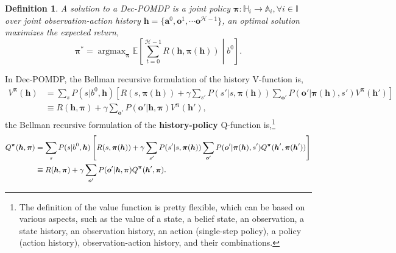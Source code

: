 \documentclass{article} %
\DeclareMathOperator*{\argmax}{argmax}
\newtheorem{definition}{Definition}
\begin{document}
\begin{definition}
A solution to a Dec-POMDP is a joint policy $\boldsymbol{\pi}:\mathbb{H}_i\to\mathbb{A}_i, \forall i \in \mathbb{I}$ over joint observation-action history $\boldsymbol{h}=\{\boldsymbol{a}^{0}, \boldsymbol{o}^{1}, \cdots \boldsymbol{o}^{\mathcal{H}-1}\}$, an optimal solution maximizes the expected return,
\[
\boldsymbol{\pi}^*=\argmax_{\boldsymbol{\pi}}\mathbb{E}\left[\textstyle\sum_{t=0}^{\mathcal{H}-1}R(\boldsymbol{h}, \boldsymbol{\pi}(\boldsymbol{h}))\middle|b^0\right].
\]
\end{definition}

In Dec-POMDP, the Bellman recursive formulation of the history V-function is,
\begin{equation}\label{eq:decpomdp-V}
\begin{aligned}
    V^{\boldsymbol{\pi}}(\boldsymbol{h}) &= \sum_{s} P(s|b^0, \boldsymbol{h})\left[R(s, \boldsymbol{\pi}(\boldsymbol{h}))+\gamma \sum_{s'}P(s'|s, \boldsymbol{\pi}(\boldsymbol{h})) \sum_{\boldsymbol{o}'}P(\boldsymbol{o}'|\boldsymbol{\pi}(\boldsymbol{h}), s') V^{\boldsymbol{\pi}}(\boldsymbol{h}') \right]\\
    &\equiv R(\boldsymbol{h}, \boldsymbol{\pi})+\gamma\sum_{\boldsymbol{o}'}P(\boldsymbol{o}'|\boldsymbol{h}, \boldsymbol{\pi}) V^{\boldsymbol{\pi}}(\boldsymbol{h}'),
\end{aligned}
\end{equation}
the Bellman recursive formulation of the \textbf{history-policy} Q-function is,\footnote{The definition of the value function is pretty flexible, which can be based on various aspects, such as the value of a state, a belief state, an observation, a state history, an observation history, an action (single-step policy), a policy (action history), observation-action history, and their combinations.}
\begin{equation}\label{eq:decpomdp-q}
\small
\begin{aligned}
    Q^{\boldsymbol{\pi}}(\boldsymbol{h}, \boldsymbol{\pi}) &= \sum_{s} P(s|b^0, \boldsymbol{h})\left[R(s, \boldsymbol{\pi}(\boldsymbol{h}))+\gamma\sum_{s'}P(s'|s, \boldsymbol{\pi}(\boldsymbol{h})) \sum_{\boldsymbol{o}'}P(\boldsymbol{o}'|\boldsymbol{\pi}(\boldsymbol{h}), s') Q^{\boldsymbol{\pi}}(\boldsymbol{h}', \boldsymbol{\pi}(\boldsymbol{h}')) \right]\\
    &\equiv R(\boldsymbol{h}, \boldsymbol{\pi})+\gamma\sum_{\boldsymbol{o}'}P(\boldsymbol{o}'|\boldsymbol{h}, \boldsymbol{\pi}) Q^{\boldsymbol{\pi}}(\boldsymbol{h}', \boldsymbol{\pi}) .
\end{aligned}
\end{equation}
\end{document}
